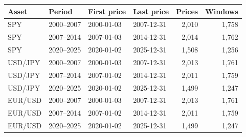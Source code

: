\begin{tabular}{llllrr}
\toprule
Asset & Period & First price & Last price & Prices & Windows \\
\midrule
SPY & 2000–2007 & 2000-01-03 & 2007-12-31 & 2,010 & 1,758 \\
SPY & 2007–2014 & 2007-01-03 & 2014-12-31 & 2,014 & 1,762 \\
SPY & 2020–2025 & 2020-01-02 & 2025-12-31 & 1,508 & 1,256 \\
USD/JPY & 2000–2007 & 2000-01-03 & 2007-12-31 & 2,013 & 1,761 \\
USD/JPY & 2007–2014 & 2007-01-02 & 2014-12-31 & 2,011 & 1,759 \\
USD/JPY & 2020–2025 & 2020-01-02 & 2025-12-31 & 1,499 & 1,247 \\
EUR/USD & 2000–2007 & 2000-01-03 & 2007-12-31 & 2,013 & 1,761 \\
EUR/USD & 2007–2014 & 2007-01-02 & 2014-12-31 & 2,011 & 1,759 \\
EUR/USD & 2020–2025 & 2020-01-02 & 2025-12-31 & 1,499 & 1,247 \\
\bottomrule
\end{tabular}
